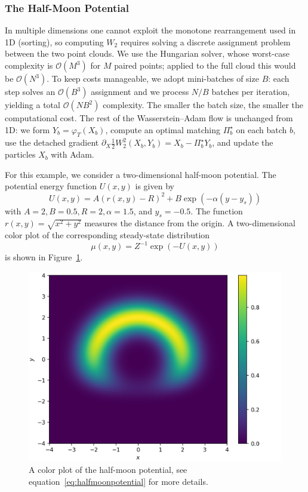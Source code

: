 \documentclass{article}
\begin{document}
\subsubsection{The Half-Moon Potential} \label{subsubsec:w2_halfmoon}
In multiple dimensions one cannot exploit the monotone rearrangement used in 1D (sorting), so computing $W_2$ requires solving a discrete assignment problem between the two point clouds. We use the Hungarian solver, whose worst-case complexity is $\mathcal{O}(M^3)$ for $M$ paired points; applied to the full cloud this would be $\mathcal{O}(N^3)$. To keep costs manageable, we adopt mini-batches of size $B$: each step solves an $\mathcal{O}(B^3)$ assignment and we process $N/B$ batches per iteration, yielding a total $\mathcal{O}(NB^2)$ complexity. The smaller the batch size, the smaller the computational cost. The rest of the Wasserstein–Adam flow is unchanged from 1D: we form $Y_b=\varphi_T(X_b)$, compute an optimal matching $\Pi_b^\star$ on each batch $b$, use the detached gradient $\partial_X \tfrac{1}{2} W_2^2(X_b, Y_b) = X_b-\Pi_b^\star Y_b$, and update the particles $X_b$ with Adam.

For this example, we consider a two-dimensional half-moon potential. The potential energy function $U(x,y)$ is given by
\begin{equation} \label{eq:halfmoonpotential}
    U(x, y) = A \left(r(x,y) - R\right)^2 + B \exp\left( - \alpha (y - y_s)\right)
\end{equation}
with $A = 2, B= 0.5, R = 2, \alpha=1.5$, and $y_s=-0.5$. The function $r(x,y) = \sqrt{x^2+y^2}$ measures the distance from the origin. A two-dimensional color plot of the corresponding steady-state distribution
\begin{equation} \label{eq:halfmoon_dist}
    \mu(x,y) = Z^{-1} \exp\left(-U(x,y)\right)
\end{equation}
is shown in Figure~\ref{fig:halfmoonpotential}.

\begin{figure}
    \centering
    \includegraphics[width=0.8\linewidth]{figures/HalfMoon.png}
    \caption{A color plot of the half-moon potential, see equation~\eqref{eq:halfmoonpotential} for more details.}
    \label{fig:halfmoonpotential}
\end{figure}
\end{document}
